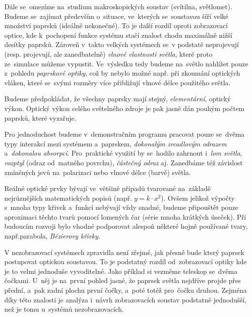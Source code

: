 Dále se~omezíme na~studium makroskopických soustav (svítilna, světlomet). Budeme se~zajímat především o~situace, ve~kterých se~soustavou šíří velké množství paprsků (ideálně nekonečné). To je další rozdíl oproti zobrazovací optice, kde k~pochopení fun\-kce systému stačí znalost chodu maximálně nižší desítky paprsků. \parencite{chaves2017introduction} Zároveň v~takto velkých systémech se~v podstatě neprojevují (resp. projevují, ale zanedbatelně) \emph{vlnové vlastnosti světla}, které proto ze~simulace můžeme vypustit. Ve~výsledku tedy budeme na~světlo nahlížet pouze z~pohledu \emph{paprskové optiky}, což by nebylo možné např. při zkoumání optických vláken, které se~svými rozměry více přibližují vlnové délce použitého světla.

Budeme předpokládat, že všechny paprsky mají stejný, \emph{elementární}, optický výkon. Optický výkon celého světelného zdroje je pak jasně dán pouhým počtem paprsků, které vyzařuje.

Pro jednoduchost budeme v~demonstračním programu pracovat pouze se~dvěma typy interakcí mezi systémem a~paprskem, \emph{dokonalým zrcadlovým odrazem} a~\emph{dokonalou absorpcí}. Pro~praktické využití by se~hodilo zahrnout i~\emph{lom světla}, \emph{rozptyl} (odraz od~matného povrchu), \emph{částečný odraz} aj. \parencite{zara2005moderni} Zanedbáme též závislost zmíněných jevů na~polarizaci nebo vlnové délce (barvě) světla.



Reálné optické prvky bývají ve~většině případů tvarované na~základě nejrůznějších matematických popisů (např. $y = k \cdot x^2$). Ovšem jelikož výpočty s~mnoha typy křivek a~funkcí nebývají vždy snadné, budeme připouštět pouze aproximaci těchto tvarů pomocí lomených čar (série mnoha krátkých úseček). Při budoucím rozvoji bylo vhodné podporovat alespoň některé hojně používané tvary, např.parabola, \emph{Bézierovy křivky}. \parencite{zara2005moderni}


V nezobrazovací systémech zpravidla není zřejmé, jak přesně bude který paprsek postupovat optickou soustavou. To je podstatný rozdíl od~zobrazovací optiky kde je to velmi jednoduše vyvoditelné. Jako příklad si vezměme teleskop se~dvěma čočkami. U~něj je na~první pohled jasné, že paprsek světla nejdříve projde přes přední, a~pak zadní plochu první čočky, a~poté totéž pro~čočku druhou. Zejména díky této znalosti je analýza i~návrh zobrazovacích soustav podstatně jednodušší, než je tomu u~systémů nezobrazovacích.

